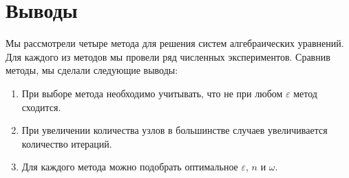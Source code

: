 \section{Выводы}

Мы рассмотрели четыре метода для решения систем алгебраических уравнений. Для каждого из методов мы провели ряд численных экспериментов. Сравнив методы, мы сделали следующие выводы:

\begin{enumerate}
	\item При выборе метода необходимо учитывать, что не при любом $\varepsilon$ метод сходится.
	\item При увеличении количества узлов в большинстве случаев увеличивается количество итераций.
	\item Для каждого метода можно подобрать оптимальное $\varepsilon$, $n$ и $\omega$.
\end{enumerate}